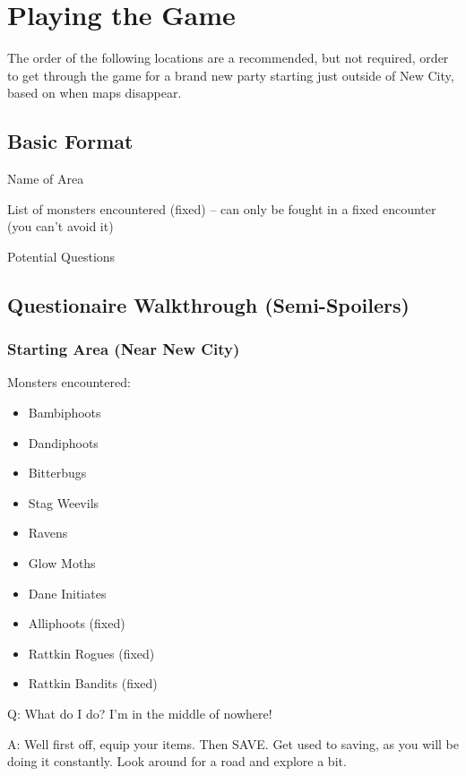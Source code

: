 \documentclass[12pt]{article}
\providecommand{\tightlist}{%
  \setlength{\itemsep}{0pt}\setlength{\parskip}{0pt}}
\begin{document}
\section{Playing the Game}\label{playing-the-game}

The order of the following locations are a recommended, but not
required, order to get through the game for a brand new party starting
just outside of New City, based on when maps disappear.

\subsection{Basic Format}\label{basic-format}

Name of Area

List of monsters encountered (fixed) -- can only be fought in a fixed
encounter (you can't avoid it)

Potential Questions

\subsection{Questionaire Walkthrough
(Semi-Spoilers)}\label{questionaire-walkthrough-semi-spoilers}

\subsubsection{Starting Area (Near New
City)}\label{starting-area-near-new-city}

Monsters encountered:

\begin{itemize}
\tightlist
\item
  Bambiphoots
\item
  Dandiphoots
\item
  Bitterbugs
\item
  Stag Weevils
\item
  Ravens
\item
  Glow Moths
\item
  Dane Initiates
\item
  Alliphoots (fixed)
\item
  Rattkin Rogues (fixed)
\item
  Rattkin Bandits (fixed)
\end{itemize}

Q: What do I do? I'm in the middle of nowhere!

A: Well first off, equip your items. Then SAVE. Get used to saving, as
you will be doing it constantly. Look around for a road and explore a
bit.
\end{document}
